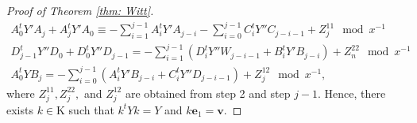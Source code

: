 \documentclass[11pt,a4paper,reqno]{amsart}
\theoremstyle{definition}
\theoremstyle{remark}
\numberwithin{equation}{section}
\begin{document}
\begin{proof}[Proof of Theorem \ref{thm: Witt}]
    \begin{equation}
    \begin{split}
        A_0^tY'A_j+A_j^tY'A_0\equiv -\sum_{i=1}^{j-1}A_i^tY'A_{j-i}-\sum_{i=0}^{j-1}C_i^tY''C_{j-i-1}+Z_j^{11}\mod x^{-1}\\
        D_{j-1}^tY''D_0+D_0^tY''D_{j-1}=-\sum_{i=1}^{j-1}\left(D_i^tY''W_{j-i-1}+B_i^tY'B_{j-i}\right)+Z_n^{22}\mod x^{-1}\\
        A_0^tYB_j=-\sum_{i=0}^{j-1}\left(A_i^tY'B_{j-i}+C_i^tY''D_{j-i-1}\right)+Z_j^{12}\mod x^{-1},
    \end{split}
    \end{equation}
    where $Z_j^{11},Z_j^{22},$ and $Z_j^{12}$ are obtained from step 2 and step $j-1$. Hence, there exists $k\in \mathrm{K}$ such that $k^tYk=Y$ and $k\mathbf{e}_1=\mathbf{v}$.
\end{proof}


\end{document}
